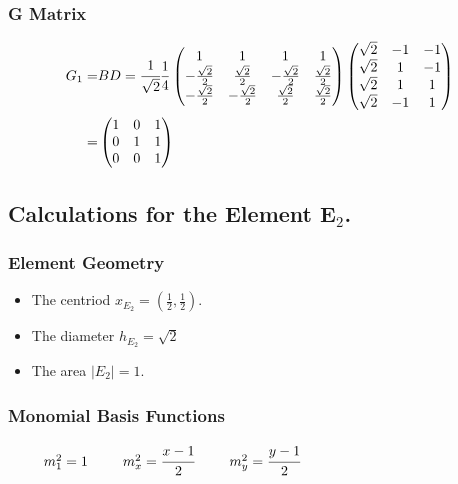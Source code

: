 \documentclass{article}
\begin{document}
{\subsubsection{G Matrix}
\begin{align*}
    G_1 =& BD =\cfrac{1}{\sqrt{2}}\frac{1}{4}
    \begin{pmatrix}
        1 & 1 & 1 & 1 \\
        -\frac{\sqrt{2}}{2} & \frac{\sqrt{2}}{2} & -\frac{\sqrt{2}}{2} & \frac{\sqrt{2}}{2}\\
        -\frac{\sqrt{2}}{2} & -\frac{\sqrt{2}}{2} & \frac{\sqrt{2}}{2} & \frac{\sqrt{2}}{2}
    \end{pmatrix}\begin{pmatrix}
        \sqrt{2} & -1 & -1\\
        \sqrt{2} & 1 & -1\\
        \sqrt{2} & 1 & 1\\
        \sqrt{2} & -1 & 1\\
    \end{pmatrix}\\
    =& \begin{pmatrix}
        1 & 0 & 1 \\
        0 & 1 & 1 \\
        0 & 0 & 1 \\
    \end{pmatrix}
\end{align*}

\subsection{Calculations for the Element E$_2$.}

\subsubsection{Element Geometry}
\begin{itemize}
    \item The centriod $x_{E_2} = (\frac{1}{2}, \frac{1}{2}).$
    \item The diameter $ h_{E_2} = \sqrt{2}$
    \item The area $|E_2| = 1$.
\end{itemize}


\subsubsection{Monomial Basis Functions}
$
\noindent\hspace*{25pt} m_1^2 = 1\\
\hspace*{25pt} m_x^2 = \cfrac{x-1}{2}\\
\hspace*{25pt} m_y^2 = \cfrac{y-1}{2}
$

}
\end{document}
